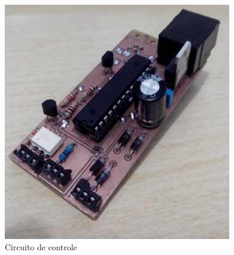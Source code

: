 \begin{figure}[H]

\center

\includegraphics[width=10cm]{imagens/circuito_microcontrolado.jpg}

\label{Circuito de controle}

\caption{Circuito de controle}

\end{figure}
